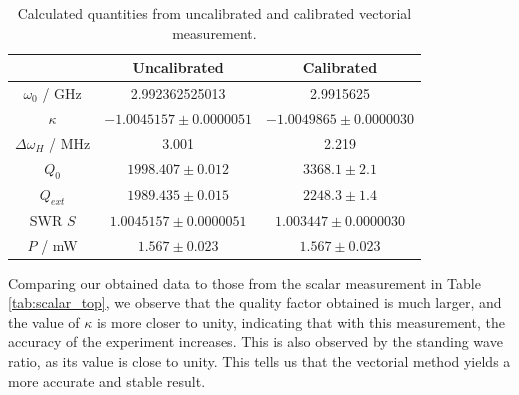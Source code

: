 \documentclass[a4paper]{report}
\numberwithin{equation}{section}
\begin{document}
\begin{table}[h!]
	\centering
	\begin{tabular}{|c|c|c|}
		\hline  & Uncalibrated & Calibrated \\ 
		\hline $\omega_0$ / GHz & 2.992362525013 & 2.9915625 \\
		\hline $\kappa$ & $-1.0045157 \pm 0.0000051$ & $-1.0049865\pm 0.0000030$ \\
		\hline $\Delta\omega_H$ / MHz & 3.001 & 2.219 \\
		\hline $Q_0$  & $1998.407 \pm 0.012$  & $3368.1 \pm 2.1$  \\
		\hline $Q_{ext}$ & $1989.435 \pm 0.015$ & $2248.3 \pm 1.4$ \\
		\hline SWR $S$ & $1.0045157 \pm 0.0000051$ & $1.003447 \pm 0.0000030$ \\
		\hline $P$ / mW & $1.567 \pm 0.023$ & $1.567 \pm 0.023$\\ 
		\hline   
	\end{tabular}
	\caption{Calculated quantities from uncalibrated and calibrated vectorial measurement. }
	\label{tab:vectorial}
\end{table}

Comparing our obtained data to those from the scalar measurement in Table \ref{tab:scalar_top}, we observe that the quality factor obtained is much larger, and the value of $\kappa$ is more
closer to unity, indicating that with this measurement, the accuracy of the experiment increases. This is also observed by the standing wave ratio, as its value is close to unity. This tells
us that the vectorial method yields a more accurate and stable result. \par





\printbibliography
\end{document}
